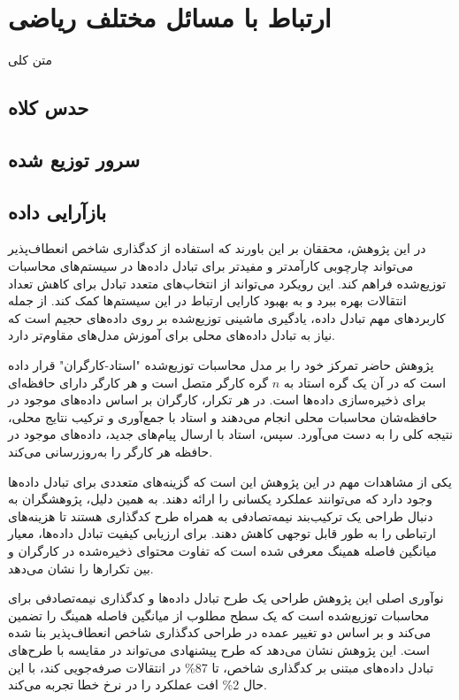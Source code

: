 \chapter{
	ارتباط با مسائل مختلف ریاضی
}
متن کلی

\section{
	حدس کلاه
}

\section{
	سرور توزیع شده
}

\section{
	بازآرایی داده
}

در این پژوهش، محققان بر این باورند که استفاده از کدگذاری شاخص انعطاف‌پذیر می‌تواند چارچوبی کارآمدتر و مفیدتر برای تبادل داده‌ها در سیستم‌های محاسبات توزیع‌شده فراهم کند. این رویکرد می‌تواند از انتخاب‌های متعدد تبادل برای کاهش تعداد انتقالات بهره ببرد و به بهبود کارایی ارتباط در این سیستم‌ها کمک کند. از جمله کاربردهای مهم تبادل داده، یادگیری ماشینی توزیع‌شده بر روی داده‌های حجیم است که نیاز به تبادل داده‌های محلی برای آموزش مدل‌های مقاوم‌تر دارد.

پژوهش حاضر تمرکز خود را بر مدل محاسبات توزیع‌شده "استاد-کارگران" قرار داده است که در آن یک گره استاد به \(n\) گره کارگر متصل است و هر کارگر دارای حافظه‌ای برای ذخیره‌سازی داده‌ها است. در هر تکرار، کارگران بر اساس داده‌های موجود در حافظه‌شان محاسبات محلی انجام می‌دهند و استاد با جمع‌آوری و ترکیب نتایج محلی، نتیجه کلی را به دست می‌آورد. سپس، استاد با ارسال پیام‌های جدید، داده‌های موجود در حافظه هر کارگر را به‌روزرسانی می‌کند.

یکی از مشاهدات مهم در این پژوهش این است که گزینه‌های متعددی برای تبادل داده‌ها وجود دارد که می‌توانند عملکرد یکسانی را ارائه دهند. به همین دلیل، پژوهشگران به دنبال طراحی یک ترکیب‌بند نیمه‌تصادفی به همراه طرح کدگذاری هستند تا هزینه‌های ارتباطی را به طور قابل توجهی کاهش دهند. برای ارزیابی کیفیت تبادل داده‌ها، معیار میانگین فاصله همینگ معرفی شده است که تفاوت محتوای ذخیره‌شده در کارگران و بین تکرارها را نشان می‌دهد.

نوآوری اصلی این پژوهش طراحی یک طرح تبادل داده‌ها و کدگذاری نیمه‌تصادفی برای محاسبات توزیع‌شده است که یک سطح مطلوب از میانگین فاصله همینگ را تضمین می‌کند و بر اساس دو تغییر عمده در طراحی کدگذاری شاخص انعطاف‌پذیر بنا شده است. این پژوهش نشان می‌دهد که طرح پیشنهادی می‌تواند در مقایسه با طرح‌های تبادل داده‌های مبتنی بر کدگذاری شاخص، تا 87\% در انتقالات صرفه‌جویی کند، با این حال 2\% افت عملکرد را در نرخ خطا تجربه می‌کند.


